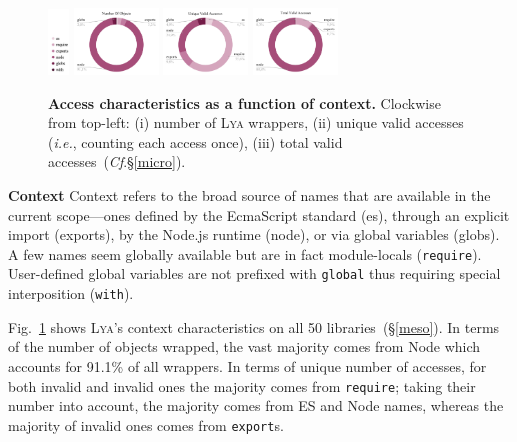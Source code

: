 \documentclass[letterpaper,twocolumn,10pt]{article}
\def\ie{{\em i.e.}, }
\newcommand{\heading}[1]{\vspace{2pt}\noindent\textbf{#1}\enspace}
\newcommand{\ttt}[1]{\texttt{#1}}
\newcommand{\cf}[1]{(\emph{Cf}.\S\ref{#1})}
\newcommand{\sx}[1]{(\S\ref{#1})}
\newcommand{\sys}{{\scshape Lya}\xspace}
\begin{document}
\begin{figure}
  \centering
  \includegraphics[width=0.05\textwidth]{./figs/lya_donut_index}
  \includegraphics[width=0.20\textwidth]{./figs/lya_ctx_obj}
  \includegraphics[width=0.20\textwidth]{./figs/lya_ctx_unique_valid}
  \includegraphics[width=0.20\textwidth]{./figs/lya_ctx_total_valid}
  \caption{
    \textbf{Access characteristics as a function of context.}
    Clockwise from top-left:
    (i) number of \sys wrappers,
    (ii) unique valid accesses (\ie counting each access once),
    (iii) total valid accesses~\cf{micro}.
  }
  \label{fig:objects}
\end{figure}

\heading{Context}
Context refers to the broad source of names that are available in the current scope---ones
  defined by the EcmaScript standard (es), 
  through an explicit import (exports),
  by the Node.js runtime (node), or
  via global variables (globs).
A few names seem globally available but are in fact module-locals (\ttt{require}).
User-defined global variables are not prefixed with \ttt{global} thus requiring special interposition (\ttt{with}).

Fig.~\ref{fig:objects} shows \sys's context characteristics on all 50 libraries~\sx{meso}. %
In terms of the number of objects wrapped, the vast majority comes from Node which accounts for 91.1\% of all wrappers.
In terms of unique number of accesses, for both invalid and invalid ones the majority comes from \ttt{require};
  taking their number into account, the majority comes from ES and Node names, whereas the majority of invalid ones comes from \ttt{export}s.
\end{document}
